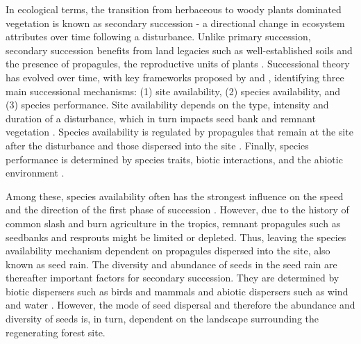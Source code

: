 In ecological terms, the transition from herbaceous to woody plants dominated vegetation is known as secondary succession - a directional change in ecosystem attributes over time following a disturbance. Unlike primary succession, secondary succession benefits from land legacies such as well-established soils and the presence of propagules, the reproductive units of plants \citep{poorterSuccessionalTheories2023}. %
Successional theory has evolved over time, with 
key frameworks proposed by \citet{pickettHierarchicalConsiderationCauses1987} and \citet{poorterComprehensiveFrameworkVegetation2024}, identifying three main successional mechanisms: (1) site availability, (2) species availability, and (3) species performance. Site availability depends on the type, intensity and duration of a disturbance, which in turn impacts seed bank and remnant vegetation \citep{poorterComprehensiveFrameworkVegetation2024}. Species availability is regulated by propagules that remain at the site after the disturbance and those dispersed into the site \citep{gleasonIndividualisticConceptPlant1926, dentUnitingNicheDifferentiation2021}. Finally, species performance is determined by species traits, biotic interactions, and the abiotic environment \citep{poorterComprehensiveFrameworkVegetation2024}. 

Among these, species availability often has the strongest influence on the speed and the direction of the first phase of succession \citep{poorterSuccessionalTheories2023, dentUnitingNicheDifferentiation2021}. However, due to the history of common slash and burn agriculture in the tropics, remnant propagules such as seedbanks and resprouts might be limited or depleted. Thus, leaving the species availability mechanism dependent on propagules dispersed into the site, also known as seed rain. The diversity and abundance of seeds in the seed rain are thereafter important factors for secondary succession. They are determined by biotic dispersers such as birds and mammals and abiotic dispersers such as wind and water \citep{poorterComprehensiveFrameworkVegetation2024}. However, the mode of seed dispersal and therefore the abundance and diversity of seeds is, in turn, dependent on the landscape surrounding the regenerating forest site. 



